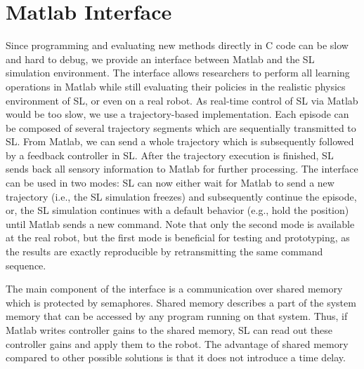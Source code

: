 \documentclass[11pt, article, colorback]{article}
\begin{document}
\section{Matlab Interface}
Since programming and evaluating new methods directly in C code can be slow and hard to debug, we provide an interface between Matlab and the SL simulation environment. 
The interface allows researchers to perform all learning operations in Matlab while still evaluating their policies in the realistic physics environment of SL, or even on a real robot. 
As real-time control of SL via Matlab would be too slow, we use a trajectory-based implementation. Each episode can be composed of several trajectory segments which 
are sequentially transmitted to SL. From Matlab, we can send a whole trajectory which is subsequently followed by a feedback controller
in SL. After the trajectory execution is finished, SL sends back all sensory information to Matlab for further processing. The interface can be used in two modes: SL can now either 
wait for Matlab to send a new trajectory (i.e., the SL simulation freezes) and subsequently continue the episode, or, the SL simulation continues with a default behavior (e.g., hold the position)
until Matlab sends a new command. Note that only the second mode is available at the real robot, but the first mode is beneficial for testing and prototyping, as the results are exactly reproducible
by retransmitting the same command sequence. 

The main component of the interface is a communication over shared memory which is protected by semaphores. Shared memory 
describes a part of the system memory that can be accessed by any program running on that system. Thus, if Matlab writes controller gains 
to the shared memory, SL can read out these controller gains and apply them to the robot. The advantage of shared memory 
compared to other possible solutions is that it does not introduce a time delay. 

\end{document}
